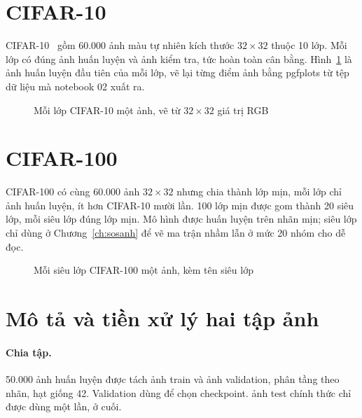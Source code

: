 \section{CIFAR-10}

CIFAR-10~\cite{krizhevsky2009} gồm 60.000 ảnh màu tự nhiên kích thước $32\times32$ thuộc 10 lớp. Mỗi lớp có đúng
 ảnh huấn luyện và  ảnh kiểm tra, tức hoàn toàn cân bằng.
Hình~\ref{fig:cifar10mau} là ảnh huấn luyện đầu tiên của mỗi lớp, vẽ lại từng điểm ảnh bằng pgfplots từ tệp dữ liệu mà
notebook 02 xuất ra.

\begin{figure}[H]
  \centering
  \caption{Mỗi lớp CIFAR-10 một ảnh, vẽ từ $32\times32$ giá trị RGB}
  \label{fig:cifar10mau}
\end{figure}

\section{CIFAR-100}

CIFAR-100 có cùng 60.000 ảnh $32\times32$ nhưng chia thành  lớp mịn, mỗi lớp chỉ
 ảnh huấn luyện, ít hơn CIFAR-10 mười lần. 100 lớp mịn được gom thành 20 siêu lớp,
mỗi siêu lớp đúng  lớp mịn. Mô hình được huấn luyện trên nhãn mịn; siêu lớp chỉ
dùng ở Chương~\ref{ch:sosanh} để vẽ ma trận nhầm lẫn ở mức 20 nhóm cho dễ đọc.

\begin{figure}[H]
  \centering
  \caption{Mỗi siêu lớp CIFAR-100 một ảnh, kèm tên siêu lớp}
  \label{fig:cifar100mau}
\end{figure}

\section{Mô tả và tiền xử lý hai tập ảnh}

\paragraph{Chia tập.} 50.000 ảnh huấn luyện được tách  ảnh train và 
ảnh validation, phân tầng theo nhãn, hạt giống 42. Validation dùng để chọn checkpoint.  ảnh test chính thức
chỉ được dùng một lần, ở cuối.


